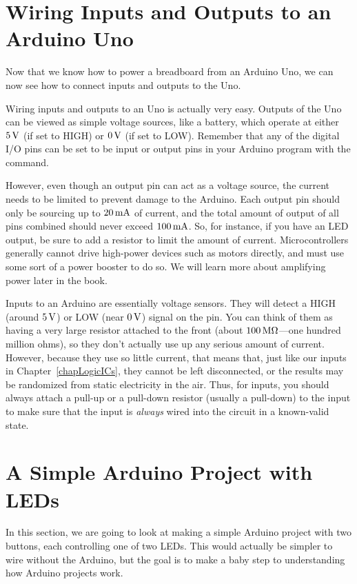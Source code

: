 \section{Wiring Inputs and Outputs to an Arduino Uno}

Now that we know how to power a breadboard from an Arduino Uno, we can now see how to connect inputs and outputs to the Uno.

Wiring inputs and outputs to an Uno is actually very easy.
Outputs of the Uno can be viewed as simple voltage sources, like a battery, which operate at either $5\,\si{\volt}$ (if set to HIGH) or $0\,\si{\volt}$ (if set to LOW).
Remember that any of the digital I/O pins can be set to be input or output pins in your Arduino program with the  command.

However, even though an output pin can act as a voltage source, the current needs to be limited to prevent damage to the Arduino.  
Each output pin should only be sourcing up to $20\,\si{\milli\ampere}$ of current, and the total amount of output of all pins combined should never exceed $100\,\si{\milli\ampere}$.
So, for instance, if you have an LED output, be sure to add a resistor to limit the amount of current.
Microcontrollers generally cannot drive high-power devices such as motors directly, and must use some sort of a power booster to do so.
We will learn more about amplifying power later in the book.

Inputs to an Arduino are essentially voltage sensors.
They will detect a HIGH (around $5\,\si{\volt}$) or LOW (near $0\,\si{\volt}$) signal on the pin.
You can think of them as having a very large resistor attached to the front (about $100\,\si{\mega\ohm}$---one hundred million ohms), so they don't actually use up any serious amount of current.
However, because they use so little current, that means that, just like our inputs in Chapter~\ref{chapLogicICs}, they cannot be left disconnected, or the results may be randomized from static electricity in the air.
Thus, for inputs, you should always attach a pull-up or a pull-down resistor (usually a pull-down) to the input to make sure that the input is \emph{always} wired into the circuit in a known-valid state.

\section{A Simple Arduino Project with LEDs}

In this section, we are going to look at making a simple Arduino project with two buttons, each controlling one of two LEDs.
This would actually be simpler to wire without the Arduino, but the goal is to make a baby step to understanding how Arduino projects work.

